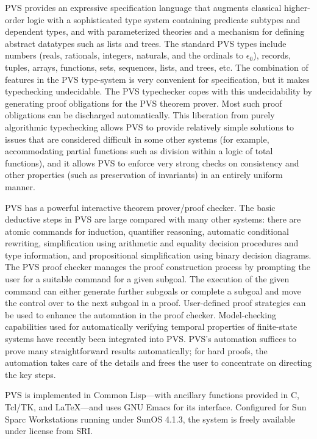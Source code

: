 \documentclass[11pt]{article}
\begin{document}
PVS provides an expressive specification language that augments
classical higher-order logic with a sophisticated type system
containing predicate subtypes and dependent types, and with
parameterized theories and a mechanism for defining abstract datatypes
such as lists and trees.  The standard PVS types include numbers
(reals, rationals, integers, naturals, and the ordinals to
$\epsilon_{0}$), records, tuples, arrays, functions, sets, sequences,
lists, and trees, etc.  The combination of features in the PVS
type-system is very convenient for specification, but it makes
typechecking undecidable.  The PVS typechecker copes with this
undecidability by generating proof obligations for the PVS theorem
prover.  Most such proof obligations can be discharged automatically.
This liberation from purely algorithmic typechecking allows PVS to
provide relatively simple solutions to issues that are considered
difficult in some other systems (for example, accommodating partial
functions such as division within a logic of total functions), and it
allows PVS to enforce very strong checks on consistency and other
properties (such as preservation of invariants) in an entirely uniform
manner.

PVS has a powerful interactive theorem prover/proof checker.  The
basic deductive steps in PVS are large compared with many other
systems: there are atomic commands for induction, quantifier
reasoning, automatic conditional rewriting, simplification using
arithmetic and equality decision procedures and type information, and
propositional simplification using binary decision diagrams.  The PVS
proof checker manages the proof construction process by prompting the
user for a suitable command for a given subgoal.  The execution of the
given command can either generate further subgoals or complete a
subgoal and move the control over to the next subgoal in a proof.
User-defined proof strategies can be used to enhance the automation in
the proof checker.  Model-checking capabilities used for automatically
verifying temporal properties of finite-state systems have recently
been integrated into PVS\@.  PVS's automation suffices to prove many
straightforward results automatically; for hard proofs, the automation
takes care of the details and frees the user to concentrate on
directing the key steps.

PVS is implemented in Common Lisp---with ancillary functions provided
in C, Tcl/TK, and \LaTeX---and uses GNU Emacs for its interface.
Configured for Sun {\sc Sparc} Workstations running under SunOS
4.1.3,  the system is freely available under license from SRI.
\end{document}
